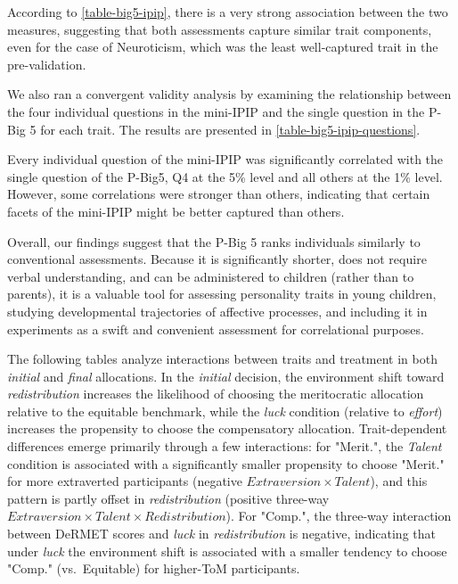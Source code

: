 \documentclass[11pt]{article}
\begin{document}
{According to \autoref{table-big5-ipip}, there is a very strong association between the two measures, suggesting that both assessments capture similar trait components, even for the case of Neuroticism, which was the least well-captured trait in the pre-validation.

We also ran a convergent validity analysis by examining the relationship between the four individual questions in the mini-IPIP and the single question in the P-Big 5 for each trait. The results are presented in \autoref{table-big5-ipip-questions}. 


  
Every individual question of the mini-IPIP was significantly correlated with the single question of the P-Big5, Q4 at the 5\% level and all others at the 1\% level. However, some correlations were stronger than others, indicating that certain facets of the mini-IPIP might be better captured than others.   
  
  
Overall, our findings suggest that the P-Big 5 ranks individuals similarly to conventional assessments. Because it is significantly shorter, does not require verbal understanding, and can be administered to children (rather than to parents), it is a valuable tool for assessing personality traits in young children, studying developmental trajectories of affective processes, and including it in experiments as a swift and convenient assessment for correlational purposes.
}
\bigskip

\par \medskip

The following tables analyze interactions between traits and treatment in both \emph{initial} and \emph{final} allocations. In the \emph{initial} decision, the environment shift toward \emph{redistribution} increases the likelihood of choosing the meritocratic allocation relative to the equitable benchmark, while the \emph{luck} condition (relative to \emph{effort}) increases the propensity to choose the compensatory allocation. Trait-dependent differences emerge primarily through a few interactions: for "Merit.", the \emph{Talent} condition is associated with a significantly smaller propensity to choose "Merit." for more extraverted participants (negative $Extraversion \times Talent$), and this pattern is partly offset in \emph{redistribution} (positive three-way $Extraversion \times Talent \times Redistribution$). For "Comp.", the three-way interaction between DeRMET scores and \emph{luck} in \emph{redistribution} is negative, indicating that under \emph{luck} the environment shift is associated with a smaller tendency to choose "Comp." (vs.\ Equitable) for higher-ToM participants. 
\end{document}
